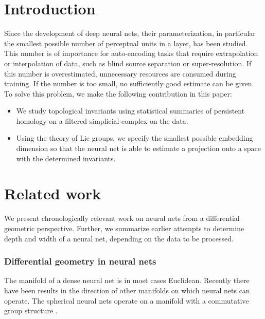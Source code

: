 \documentclass[runningheads,orivec]{llncs}
\begin{document}
\section{Introduction}
Since the development of deep neural nets, their parameterization, in particular the smallest possible number of perceptual units in a layer, has been studied. This number is of importance for auto-encoding tasks that require extrapolation or interpolation of data, such as blind source separation or super-resolution. If this number is overestimated, unnecessary resources are consumed during training. If the number is too small, no sufficiently good estimate can be given. To solve this problem, we make the following contribution in this paper:
\begin{itemize}
    \item We study topological invariants using statistical summaries of persistent homology on a filtered simplicial complex on the data.
    \item Using the theory of Lie groups, we specify the smallest possible embedding dimension so that the neural net is able to estimate a projection onto a space with the determined invariants.
\end{itemize}

\section{Related work}
We present chronologically relevant work on neural nets from a differential geometric perspective. Further, we summarize earlier attempts to determine depth and width of a neural net, depending on the data to be processed.

\subsubsection*{Differential geometry in neural nets} The manifold of a dense neural net is in most cases Euclidean. Recently there have been results in the direction of other manifolds on which neural nets can operate. The spherical neural nets operate on a manifold with a commutative group structure \cite{CohenGKW18,EstevesAMD20}.
\end{document}
